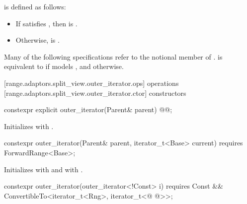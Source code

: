 {{\color{oldclr}
\pnum
{} is defined
as follows:
\begin{itemize}
\item If  satisfies ,
then  is .

\item Otherwise,  is .
\end{itemize}
} %

{\color{newclr}
\pnum
Many of the following specifications refer to the notional member
 of .
 is equivalent to  if 
models , and  otherwise.
} %

[range.adaptors.split_view.outer_iterator.ops]{ operations}
[range.adaptors.split_view.outer_iterator.ctor]{ constructors}

%
\begin{itemdecl}
constexpr explicit outer_iterator(Parent& parent)
  @@;
\end{itemdecl}

\begin{itemdescr}
\pnum
\effects Initializes  with .
\end{itemdescr}

%
\begin{itemdecl}
constexpr outer_iterator(Parent& parent, iterator_t<Base> current)
  requires ForwardRange<Base>;
\end{itemdecl}

\begin{itemdescr}
\pnum
\effects Initializes  with 
and  with .
\end{itemdescr}

%
\begin{itemdecl}
constexpr outer_iterator(outer_iterator<!Const> i) requires Const &&
  ConvertibleTo<iterator_t<Rng>, iterator_t<@ @>>;
\end{itemdecl}

}
